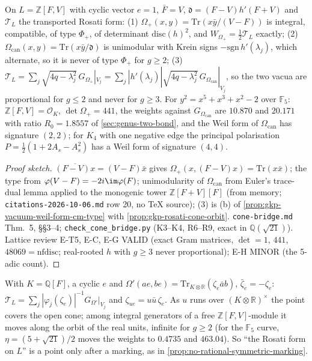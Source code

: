 \begin{theorem} %
\label{thm:gkp-genus-g-bridge} 
On $L = \mathbb Z[F,V]$ with cyclic vector $e = 1$, $\bar F = V$, $\mathfrak d = (F-V)h'(F+V)$ and $\mathcal T_L$ the transported Rosati form: (1) $\Omega_+(x,y) = %
\mathrm{Tr}(x\bar y/(V-F))$ is integral, compatible, of type $\Phi_+$, of determinant $\mathrm{disc}(h)^2$, and $W_{\Omega_+} = \tfrac12\mathcal T_L$ exactly; (2) %
$\Omega_{\mathrm{can}}(x,y) = \mathrm{Tr}(x\bar y/\mathfrak d)$ is unimodular with Krein signs $-\mathrm{sgn}\,h'(\lambda_j)$, which alternate, so it is never of type $\Phi_+$ %
for $g\ge2$; (3) $\mathcal T_L = \sum_j\sqrt{4q-\lambda_j^2}\,G_{\Omega_+}|_{V_j} = \sum_j|h'(\lambda_j)|\sqrt{4q-\lambda_j^2}\,G_{\Omega_{\mathrm{can}}}|_{V_j}$, so the two %
vacua are proportional for $g\le2$ and never for $g\ge3$. For $y^2 = x^5+x^3+x^2-2$ over $\mathbb F_5$: $\mathbb Z[F,V] = \mathcal O_K$, $\det\Omega_+ = 441$, the weights against %
$G_{\Omega_{\mathrm{can}}}$ are $10.870$ and $20.171$ with ratio $R_0 = 1.8557$ of \cref{sec:genus-two-bond}, and the Weil form of $\Omega_{\mathrm{can}}$ has signature $(2,2)$; %
for $K_4$ with one negative edge the principal polarisation $P = \tfrac12(1+2A_s-A_s^2)$ has a Weil form of signature $(4,4)$.
\end{theorem}
\begin{proof}[Proof sketch] $\overline{(F-V)x} = (V-F)\bar x$ gives $\Omega_+(x,(F-V)x) = \mathrm{Tr}(x\bar x)$; the type from $\varphi(V-F) = -2i\im\varphi(F)$; unimodularity of %
$\Omega_{\mathrm{can}}$ from Euler's trace-dual lemma applied to the monogenic tower $\mathbb Z[F+V][F]$ (from memory; \texttt{citations-2026-10-06.md} row 20, no TeX source); %
(3) is (b) of \cref{prop:gkp-vacuum-weil-form-cm-type} with \cref{prop:gkp-rosati-cone-orbit}. \texttt{cone-bridge.md} Thm.~5, \S\S3--4; \texttt{check\_cone\_bridge.py} (K3--K4,
R6--R9, exact in $\mathbb Q(\sqrt{21})$). Lattice review E-T5, E-C, E-G VALID (exact Gram matrices, $\det = 1$, $441$, $48069 = \mathrm{nfdisc}$; real-rooted $h$ with $g\ge3$
never proportional); E-H MINOR (the 5-adic count).
\end{proof}
\begin{proposition}
\label{prop:gkp-rosati-cone-orbit} 
With $K = \mathbb Q[F]$, a cyclic $e$ and $\Omega'(ae,be) = \mathrm{Tr}_{K\otimes\mathbb R}(\zeta_e\bar ab)$, $\bar\zeta_e = -\zeta_e$: $\mathcal T_L = %
\sum_j|\varphi_j(\zeta_e)|^{-1}G_{\Omega'}|_{V_j}$ and $\zeta_{ue} = u\bar u\,\zeta_e$. As $u$ runs over $(K\otimes\mathbb R)^\times$ the point covers the open cone; among %
integral generators of a free $\mathbb Z[F,V]$-module it moves along the orbit of the real units, infinite for $g\ge2$ (for the $\mathbb F_5$ curve, $\eta = (5+\sqrt{21})/2$
moves the weights to $0.4735$ and $463.04$). So ``the Rosati form on $L$'' is a point only after a marking, as in \cref{prop:no-rational-symmetric-marking}.
\end{proposition}
